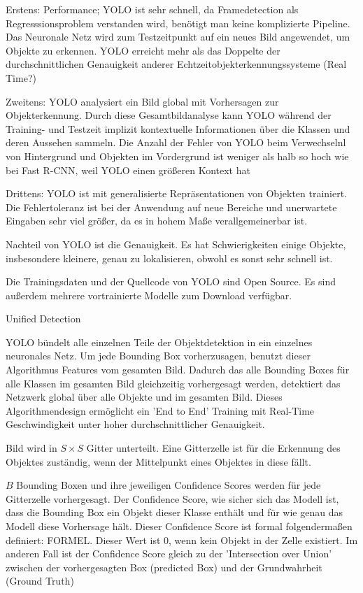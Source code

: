 {\begin{list}{-}{Quelle: \citet{Plastiras2018}}
			\item Erstens: Performance; YOLO ist sehr schnell, da Framedetection als Regresssionsproblem verstanden wird, benötigt man keine komplizierte Pipeline. Das Neuronale Netz wird zum Testzeitpunkt auf ein neues Bild angewendet, um Objekte zu erkennen. YOLO erreicht mehr als das Doppelte der durchschnittlichen Genauigkeit anderer Echtzeitobjekterkennungssysteme (Real Time?)
			\item Zweitens: YOLO analysiert ein Bild global mit Vorhersagen zur Objekterkennung. Durch diese Gesamtbildanalyse kann YOLO während der Training- und Testzeit implizit kontextuelle Informationen über die Klassen und deren Aussehen sammeln. Die Anzahl der Fehler von YOLO beim Verwechselnl von Hintergrund und Objekten im Vordergrund ist weniger als halb so hoch wie bei Fast R-CNN, weil YOLO einen größeren Kontext hat
			\item Drittens: YOLO ist mit  generalisierte Repräsentationen von Objekten trainiert. Die Fehlertoleranz ist bei der Anwendung auf neue Bereiche und unerwartete Eingaben sehr viel größer, da es in hohem Maße verallgemeinerbar ist.
			\item Nachteil von YOLO ist die Genauigkeit. Es hat Schwierigkeiten einige Objekte, insbesondere kleinere, genau zu lokalisieren, obwohl es sonst sehr schnell ist.
			\item Die Trainingsdaten und der Quellcode von YOLO sind Open Source. Es sind außerdem mehrere vortrainierte Modelle zum Download verfügbar.
		\item Unified Detection
			\item YOLO bündelt alle einzelnen Teile der Objektdetektion in ein einzelnes neuronales Netz. Um jede Bounding Box vorherzusagen, benutzt dieser Algorithmus Features vom gesamten Bild. Dadurch das alle Bounding Boxes für alle Klassen im gesamten Bild gleichzeitig vorhergesagt werden, detektiert das Netzwerk global über alle Objekte und im gesamten Bild. Dieses Algorithmendesign ermöglicht ein 'End to End' Training mit Real-Time Geschwindigkeit unter hoher durchschnittlicher Genauigkeit.
			\item Bild wird in $S \times S$ Gitter unterteilt. Eine Gitterzelle ist für die Erkennung des Objektes zuständig, wenn der Mittelpunkt eines Objektes in diese fällt.
			\item $B$ Bounding Boxen und  ihre jeweiligen Confidence Scores werden für jede Gitterzelle vorhergesagt. Der Confidence Score, wie sicher sich das Modell ist, dass die Bounding Box ein Objekt dieser Klasse enthält und für wie genau das Modell diese Vorhersage hält. Dieser Confidence Score ist formal folgendermaßen definiert: FORMEL. Dieser Wert ist 0, wenn kein Objekt in der Zelle existiert. Im anderen Fall ist der Confidence Score gleich zu der 'Intersection over Union' zwischen der vorhergesagten Box (predicted Box) und der Grundwahrheit (Ground Truth)

\end{list}}
